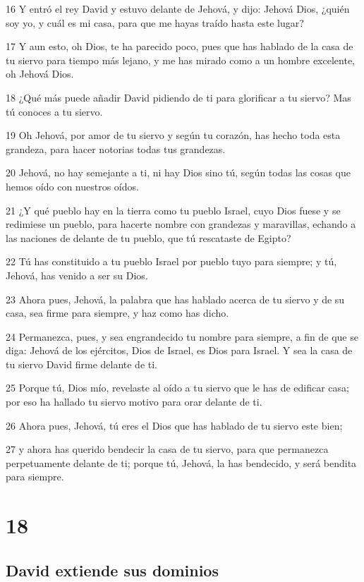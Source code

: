 \par 16 Y entró el rey David y estuvo delante de Jehová, y dijo: Jehová Dios, ¿quién soy yo, y cuál es mi casa, para que me hayas traído hasta este lugar?
\par 17 Y aun esto, oh Dios, te ha parecido poco, pues que has hablado de la casa de tu siervo para tiempo más lejano, y me has mirado como a un hombre excelente, oh Jehová Dios.
\par 18 ¿Qué más puede añadir David pidiendo de ti para glorificar a tu siervo? Mas tú conoces a tu siervo.
\par 19 Oh Jehová, por amor de tu siervo y según tu corazón, has hecho toda esta grandeza, para hacer notorias todas tus grandezas.
\par 20 Jehová, no hay semejante a ti, ni hay Dios sino tú, según todas las cosas que hemos oído con nuestros oídos.
\par 21 ¿Y qué pueblo hay en la tierra como tu pueblo Israel, cuyo Dios fuese y se redimiese un pueblo, para hacerte nombre con grandezas y maravillas, echando a las naciones de delante de tu pueblo, que tú rescataste de Egipto?
\par 22 Tú has constituido a tu pueblo Israel por pueblo tuyo para siempre; y tú, Jehová, has venido a ser su Dios.
\par 23 Ahora pues, Jehová, la palabra que has hablado acerca de tu siervo y de su casa, sea firme para siempre, y haz como has dicho.
\par 24 Permanezca, pues, y sea engrandecido tu nombre para siempre, a fin de que se diga: Jehová de los ejércitos, Dios de Israel, es Dios para Israel. Y sea la casa de tu siervo David firme delante de ti.
\par 25 Porque tú, Dios mío, revelaste al oído a tu siervo que le has de edificar casa; por eso ha hallado tu siervo motivo para orar delante de ti.
\par 26 Ahora pues, Jehová, tú eres el Dios que has hablado de tu siervo este bien;
\par 27 y ahora has querido bendecir la casa de tu siervo, para que permanezca perpetuamente delante de ti; porque tú, Jehová, la has bendecido, y será bendita para siempre.

\chapter{18}

\section*{David extiende sus dominios}

